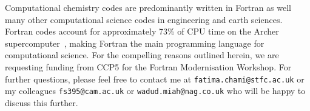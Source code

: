 \documentclass[12pt]{article}
\begin{document}
Computational chemistry codes are predominantly written in Fortran as well many other computational science codes in
engineering and earth sciences. Fortran codes account for approximately 73\% of CPU time on the Archer
supercomputer~\cite{archer:usage}, making Fortran the main programming language for computational science. For the compelling
reasons outlined herein, we are requesting funding from CCP5 for the Fortran Modernisation Workshop. For further questions,
please feel free to contact me at \texttt{fatima.chami@stfc.ac.uk} or my colleagues \texttt{fs395@cam.ac.uk} or 
\texttt{wadud.miah@nag.co.uk} who will be happy to discuss this further. 
%


%
\end{document}

